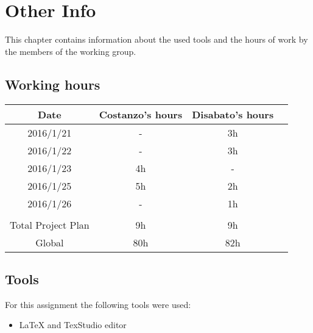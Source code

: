 \documentclass[\mainpath/main]{subfiles}
\begin{document}
\chapter{Other Info}
\label{OtherInfo}

\setmyfancystyle

This chapter contains information about the used tools and the hours of work by the members of the working group.

\section{Working hours}
\begin{table}[h!]
	\centering
\begin{tabular}{cccc}
\hline
Date     	& Costanzo's hours & Disabato's hours  & \\ \hline
2016/1/21 	& -			  	   & 3h 			   & \\ \hline
2016/1/22 	& -			  	   & 3h 			   & \\ \hline
2016/1/23   & 4h               & -                 & \\ \hline
2016/1/25   & 5h             & 2h                & \\ \hline
2016/1/26   & -                & 1h                & \\ \hline
\\
Total Project Plan  & 9h 		 	   & 9h 			   & \\ \hline
Global 	    & 80h 		 	   & 82h 			   & \\ \hline

\end{tabular}
\end{table}

\section{Tools}
For this assignment the following tools were used:
\begin{itemize}
	\item \LaTeX{} and TexStudio editor
\end{itemize}
\end{document}
